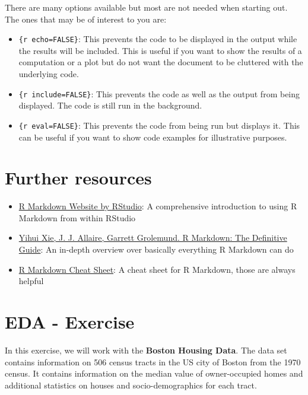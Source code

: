 \documentclass[
]{book}
\providecommand{\tightlist}{%
  \setlength{\itemsep}{0pt}\setlength{\parskip}{0pt}}
\begin{document}
There are many options available but most are not needed when starting out. The ones that may be of interest to you are:

\begin{itemize}
\tightlist
\item
  \texttt{\{r\ echo=FALSE\}}: This prevents the code to be displayed in the output while the results will be included. This is useful if you want to show the results of a computation or a plot but do not want the document to be cluttered with the underlying code.
\item
  \texttt{\{r\ include=FALSE\}}: This prevents the code as well as the output from being displayed. The code is still run in the background.
\item
  \texttt{\{r\ eval=FALSE\}}: This prevents the code from being run but displays it. This can be useful if you want to show code examples for illustrative purposes.
\end{itemize}

\hypertarget{further-resources-1}{%
\section{Further resources}\label{further-resources-1}}

\begin{itemize}
\tightlist
\item
  \href{https://rmarkdown.rstudio.com/lesson-1.html}{R Markdown Website by RStudio}: A comprehensive introduction to using R Markdown from within RStudio
\item
  \href{https://bookdown.org/yihui/rmarkdown/}{Yihui Xie, J. J. Allaire, Garrett Grolemund. R Markdown: The Definitive Guide}: An in-depth overview over basically everything R Markdown can do
\item
  \href{https://rstudio.github.io/cheatsheets/rmarkdown.pdf}{R Markdown Cheat Sheet}: A cheat sheet for R Markdown, those are always helpful
\end{itemize}

\hypertarget{eda---exercise}{%
\section{EDA - Exercise}\label{eda---exercise}}

In this exercise, we will work with the \textbf{Boston Housing Data}. The data set contains information on 506 census tracts in the US city of Boston from the 1970 census. It contains information on the median value of owner-occupied homes and additional statistics on houses and socio-demographics for each tract.
\end{document}
